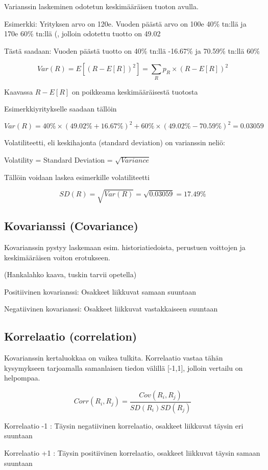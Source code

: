 \documentclass[a4paper]{article}
\begin{document}
Varianssin laskeminen odotetun keskimääräisen tuoton avulla.

Esimerkki: Yrityksen arvo on 120e. Vuoden päästä arvo on 100e 40\% tn:llä ja 170e 60\% tn:llä (, jolloin odotettu tuotto on 49.02%

Tästä saadaan: Vuoden päästä tuotto on 40\% tn:llä -16.67\% ja 70.59\% tn:llä 60\%

\[
Var(R) = E[(R - E[R])^2] = \sum_R{p_R \times (R - E[R])^2}
\]

Kaavassa $R - E[R]$ on poikkeama keskimääräisestä tuotosta

Esimerkkiyritykselle saadaan tällöin

\[
Var(R) = 40\% \times (49.02\% + 16.67\%)^2 + 60\% \times (49.02\% - 70.59\%)^2 = 0.03059
\]

Volatiliteetti, eli keskihajonta (standard deviation) on varianssin neliö:

Volatility = Standard Deviation = $\sqrt{Variance}$

Tällöin voidaan laskea esimerkille volatiliteetti

\[
SD(R) = \sqrt{Var(R)} = \sqrt{0.03059} = 17.49\%
\]

\subsection{Kovarianssi (Covariance)}

Kovarianssin pystyy laskemaan esim. historiatiedoista, perustuen voittojen ja keskimääräisen voiton erotukseen.

(Hankalahko kaava, tuskin tarvii opetella)

Positiivinen kovarianssi: Osakkeet liikkuvat samaan suuntaan

Negatiivinen kovarianssi: Osakkeet liikkuvat vastakkaiseen suuntaan

\subsection{Korrelaatio (correlation)}

Kovarianssin kertaluokkaa on vaikea tulkita. Korrelaatio vastaa tähän kysymykseen tarjoamalla samanlaisen tiedon välillä [-1,1], jolloin vertailu on helpompaa.

\[
    Corr(R_i, R_j) = \frac{Cov(R_i, R_j)}{SD(R_i) SD(R_j)}
\]

Korrelaatio -1 : Täysin negatiivinen korrelaatio, osakkeet liikkuvat täysin eri suuntaan

Korrelaatio +1 : Täysin positiivinen korrelaatio, osakkeet liikkuvat täysin samaan suuntaan
\end{document}

